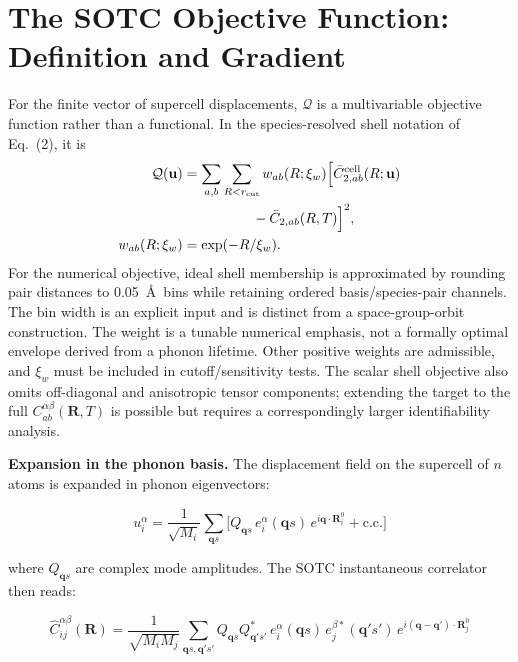 \documentclass[aps,prb,reprint,amsmath,amssymb,floatfix]{revtex4-2}
\begin{document}
\color{revisionblue}
\section{The SOTC Objective Function: Definition and
Gradient}\label{appendix-c-the-sotc-objective-functional-derivation-and-gradient}
\color{black}

\color{revisionblue}
For the finite vector of supercell displacements, \(\mathcal Q\) is a
multivariable objective function rather than a functional. In the
species-resolved shell notation of Eq.~(2), it is
\begin{align*}
\mathcal Q(\mathbf u)
 &=\sum_{a,b}\sum_{R<r_{\rm cut}}w_{ab}(R;\xi_w)
 \Bigl[\bar C_{2,ab}^{\rm cell}(R;\mathbf u)\nonumber\\
 &\hspace{5em}-\bar C_{2,ab}(R,T)\Bigr]^2,\\
w_{ab}(R;\xi_w)&=\exp(-R/\xi_w).
\end{align*}
For the numerical objective, ideal shell membership is approximated by rounding
pair distances to 0.05~\AA\ bins while retaining ordered basis/species-pair
channels. The bin width is an explicit input and is distinct from a
space-group-orbit construction.
The weight is a tunable numerical emphasis, not a formally optimal envelope
derived from a phonon lifetime. Other positive weights are admissible, and
\(\xi_w\) must be included in cutoff/sensitivity tests. The scalar shell
objective also omits off-diagonal and anisotropic tensor components; extending
the target to the full \(C_{ab}^{\alpha\beta}(\mathbf R,T)\) is possible but
requires a correspondingly larger identifiability analysis.
\color{black}

\textbf{Expansion in the phonon basis.} The displacement field on the
supercell of \(n\) atoms is expanded in phonon eigenvectors:

\begin{equation*}
u_i^\alpha = \frac{1}{\sqrt{M_i}}\sum_{\mathbf{q}s}\bigl[Q_{\mathbf{q}s}\,e_i^\alpha(\mathbf{q}s)\,e^{i\mathbf{q}\cdot\mathbf{R}_i^0} + \text{c.c.}\bigr]
\end{equation*}

where \(Q_{\mathbf{q}s}\) are complex mode amplitudes. The SOTC
instantaneous correlator then reads:

\color{revisionblue}
{\scriptsize
\begin{equation*}
\hat{C}_{ij}^{\alpha\beta}(\mathbf{R}) = \frac{1}{\sqrt{M_iM_j}}\sum_{\mathbf{q}s,\mathbf{q}'s'} Q_{\mathbf{q}s}Q_{\mathbf{q}'s'}^*\, e_i^\alpha(\mathbf{q}s)\,e_j^{\beta*}(\mathbf{q}'s')\, e^{i(\mathbf{q}-\mathbf{q}')\cdot\mathbf{R}_j^0}
\end{equation*}
}
\color{black}
\end{document}
